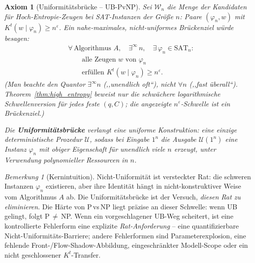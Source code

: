 \documentclass[aps,prd,twocolumn,superscriptaddress,nofootinbib]{revtex4-2}
\newtheorem{axiom}[theorem]{Axiom}
\theoremstyle{definition}
\theoremstyle{remark}
\newtheorem{remark}[theorem]{Bemerkung}
\begin{document}
\begin{axiom}[Uniformitätsbrücke -- UB-PvNP]\label{ax:ub-pvnp}
Sei $\mathcal{W}_n$ die Menge der Kandidaten für Hoch-Entropie-Zeugen bei SAT-Instanzen der Größe $n$: Paare $(\varphi_n, w)$ mit $K^t(w \mid \varphi_n) \geq n^\varepsilon$. Ein nahe-maximales, nicht-uniformes Brückenziel würde besagen:
\[
\begin{aligned}
&\forall\, \text{Algorithmus } A,\quad
  \exists^\infty\, n,\quad
  \exists\, \varphi_n \in \mathrm{SAT}_n:\\
&\qquad \text{alle Zeugen } w \text{ von } \varphi_n\\
&\qquad \text{erfüllen } K^t(w \mid \varphi_n) \geq n^\varepsilon.
\end{aligned}
\]
(Man beachte den Quantor $\exists^\infty n$ (,,unendlich oft``), nicht $\forall n$ (,,fast überall``). Theorem~\ref{thm:high_entropy} beweist nur die schwächere logarithmische Schwellenversion für jedes feste $(q,C)$; die angezeigte $n^\varepsilon$-Schwelle ist ein Brückenziel.)

Die \textbf{Uniformitätsbrücke} verlangt eine \emph{uniforme} Konstruktion: eine einzige deterministische Prozedur $\mathcal{U}$, sodass bei Eingabe $1^n$ die Ausgabe $\mathcal{U}(1^n)$ eine Instanz $\varphi_n$ mit obiger Eigenschaft für unendlich viele $n$ erzeugt, unter Verwendung polynomieller Ressourcen in $n$.
\end{axiom}

\begin{remark}[Kernintuition]\label{rem:ub-intuition}
Nicht-Uniformität ist \glqq versteckter Rat\grqq{}: die schweren Instanzen $\varphi_n$ existieren, aber ihre Identität hängt in nicht-konstruktiver Weise vom Algorithmus $A$ ab. Die Uniformitätsbrücke ist der Versuch, \emph{diesen Rat zu eliminieren}. Die Härte von P\,vs\,NP liegt präzise an dieser Schwelle: wenn UB gelingt, folgt P$\,\neq\,$NP. Wenn ein vorgeschlagener UB-Weg scheitert, ist eine kontrollierte Fehlerform eine explizite \emph{Rat-Anforderung} -- eine quantifizierbare Nicht-Uniformitäts-Barriere; andere Fehlerformen sind Parameterexplosion, eine fehlende Front-/Flow-Shadow-Abbildung, eingeschränkter Modell-Scope oder ein nicht geschlossener $K^t$-Transfer.
\end{remark}
\end{document}
